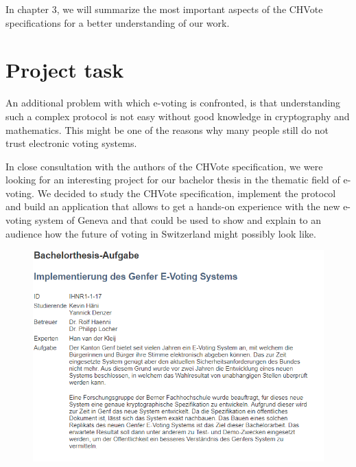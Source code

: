 In chapter 3, we will summarize the most important aspects of the CHVote specifications for a better understanding of our work.

\section{Project task}
An additional problem with which e-voting is confronted, is that understanding such a complex protocol is not easy without good knowledge in cryptography and mathematics. This might be one of the reasons why many people still do not trust electronic voting systems.

In close consultation with the authors of the CHVote specification, we were looking for an interesting project for our bachelor thesis in the thematic field of e-voting. We decided to study the CHVote specification, implement the protocol and build an application that allows to get a hands-on experience with the new e-voting system of Geneva and that could be used to show and explain to an audience how the future of voting in Switzerland might possibly look like.

\begin{figure}
\begin{center}
\includegraphics[scale=0.95]{assets/aufgabe.PNG}
\label{Bachelor thesis task}%
\end{center}
\end{figure}

